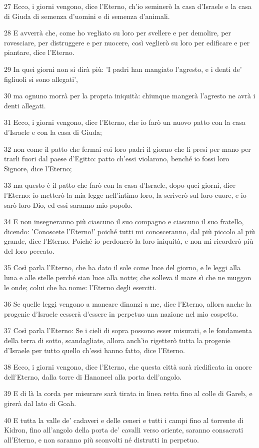 \par 27 Ecco, i giorni vengono, dice l'Eterno, ch'io seminerò la casa d'Israele e la casa di Giuda di semenza d'uomini e di semenza d'animali.
\par 28 E avverrà che, come ho vegliato su loro per svellere e per demolire, per rovesciare, per distruggere e per nuocere, così veglierò su loro per edificare e per piantare, dice l'Eterno.
\par 29 In quei giorni non si dirà più: 'I padri han mangiato l'agresto, e i denti de' figliuoli si sono allegati',
\par 30 ma ognuno morrà per la propria iniquità: chiunque mangerà l'agresto ne avrà i denti allegati.
\par 31 Ecco, i giorni vengono, dice l'Eterno, che io farò un nuovo patto con la casa d'Israele e con la casa di Giuda;
\par 32 non come il patto che fermai coi loro padri il giorno che li presi per mano per trarli fuori dal paese d'Egitto: patto ch'essi violarono, benché io fossi loro Signore, dice l'Eterno;
\par 33 ma questo è il patto che farò con la casa d'Israele, dopo quei giorni, dice l'Eterno: io metterò la mia legge nell'intimo loro, la scriverò sul loro cuore, e io sarò loro Dio, ed essi saranno mio popolo.
\par 34 E non insegneranno più ciascuno il suo compagno e ciascuno il suo fratello, dicendo: 'Conoscete l'Eterno!' poiché tutti mi conosceranno, dal più piccolo al più grande, dice l'Eterno. Poiché io perdonerò la loro iniquità, e non mi ricorderò più del loro peccato.
\par 35 Così parla l'Eterno, che ha dato il sole come luce del giorno, e le leggi alla luna e alle stelle perché sian luce alla notte; che solleva il mare sì che ne muggon le onde; colui che ha nome: l'Eterno degli eserciti.
\par 36 Se quelle leggi vengono a mancare dinanzi a me, dice l'Eterno, allora anche la progenie d'Israele cesserà d'essere in perpetuo una nazione nel mio cospetto.
\par 37 Così parla l'Eterno: Se i cieli di sopra possono esser misurati, e le fondamenta della terra di sotto, scandagliate, allora anch'io rigetterò tutta la progenie d'Israele per tutto quello ch'essi hanno fatto, dice l'Eterno.
\par 38 Ecco, i giorni vengono, dice l'Eterno, che questa città sarà riedificata in onore dell'Eterno, dalla torre di Hananeel alla porta dell'angolo.
\par 39 E di là la corda per misurare sarà tirata in linea retta fino al colle di Gareb, e girerà dal lato di Goah.
\par 40 E tutta la valle de' cadaveri e delle ceneri e tutti i campi fino al torrente di Kidron, fino all'angolo della porta de' cavalli verso oriente, saranno consacrati all'Eterno, e non saranno più sconvolti né distrutti in perpetuo.

